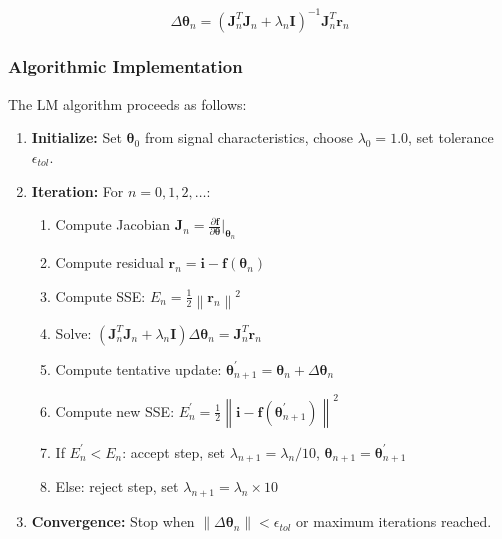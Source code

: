 \documentclass[12pt,a4paper]{article}
\newcommand{\norm}[1]{\left\lVert#1\right\rVert}
\newcommand{\deltatheta}{\Delta\boldsymbol{\theta}}
\begin{document}
\begin{equation}
\deltatheta_{n} = (\mathbf{J}_n^T \mathbf{J}_n + \lambda_n \mathbf{I})^{-1} \mathbf{J}_n^T \mathbf{r}_n
\label{eq:lm_step}
\end{equation}

\subsubsection{Algorithmic Implementation}

The LM algorithm proceeds as follows:

\begin{enumerate}
    \item \textbf{Initialize:} Set $\boldsymbol{\theta}_0$ from signal characteristics, 
    choose $\lambda_0 = 1.0$, set tolerance $\epsilon_{tol}$.
    
    \item \textbf{Iteration:} For $n = 0, 1, 2, \ldots$:
    \begin{enumerate}
        \item Compute Jacobian $\mathbf{J}_n = \frac{\partial \mathbf{f}}{\partial \boldsymbol{\theta}}\bigg|_{\boldsymbol{\theta}_n}$
        \item Compute residual $\mathbf{r}_n = \mathbf{i} - \mathbf{f}(\boldsymbol{\theta}_n)$
        \item Compute SSE: $E_n = \frac{1}{2}\norm{\mathbf{r}_n}^2$
        \item Solve: $(\mathbf{J}_n^T \mathbf{J}_n + \lambda_n \mathbf{I}) \deltatheta_n = \mathbf{J}_n^T \mathbf{r}_n$
        \item Compute tentative update: $\boldsymbol{\theta}_{n+1}^{\prime} = \boldsymbol{\theta}_n + \deltatheta_n$
        \item Compute new SSE: $E_n^{\prime} = \frac{1}{2}\norm{\mathbf{i} - \mathbf{f}(\boldsymbol{\theta}_{n+1}^{\prime})}^2$
        \item If $E_n^{\prime} < E_n$: accept step, set $\lambda_{n+1} = \lambda_n / 10$, 
        $\boldsymbol{\theta}_{n+1} = \boldsymbol{\theta}_{n+1}^{\prime}$
        \item Else: reject step, set $\lambda_{n+1} = \lambda_n \times 10$
    \end{enumerate}
    
    \item \textbf{Convergence:} Stop when $\norm{\deltatheta_n} < \epsilon_{tol}$ or 
    maximum iterations reached.
\end{enumerate}
\end{document}
